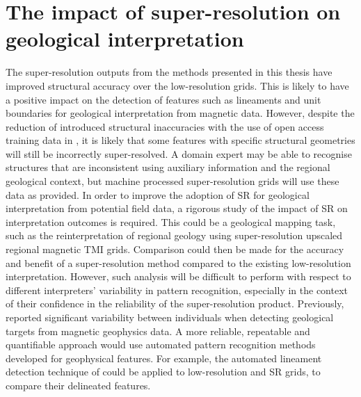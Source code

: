 \section[Super-resolution impact on geological interpretation]{The impact of super-resolution on geological interpretation}
The super-resolution outputs from the methods presented in this thesis have improved structural accuracy over the low-resolution grids.
This is likely to have a positive impact on the detection of features such as lineaments and unit boundaries for geological interpretation from magnetic data.
However, despite the reduction of introduced structural inaccuracies with the use of open access training data in , it is likely that some features with specific structural geometries will still be incorrectly super-resolved.
A domain expert may be able to recognise structures that are inconsistent using auxiliary information and the regional geological context, but machine processed super-resolution grids will use these data as provided.
In order to improve the adoption of SR for geological interpretation from potential field data, a rigorous study of the impact of SR on interpretation outcomes is required.
This could be a geological mapping task, such as the reinterpretation of regional geology using super-resolution upscaled regional magnetic TMI grids.
Comparison could then be made for the accuracy and benefit of a super-resolution method compared to the existing low-resolution interpretation.
However, such analysis will be difficult to perform with respect to different interpreters' variability in pattern recognition, especially in the context of their confidence in the reliability of the super-resolution product.
Previously, \textcite{sivarajahIdentifyingEffectiveInterpretation2013} reported significant variability between individuals when detecting geological targets from magnetic geophysics data.
A more reliable, repeatable and quantifiable approach would use automated pattern recognition methods developed for geophysical features.
For example, the automated lineament detection technique of \textcite{holdenAutomaticIdentificationResponses2011,holdenAutomatedAnalysisRegional2008} could be applied to low-resolution and SR grids, to compare their delineated features.

